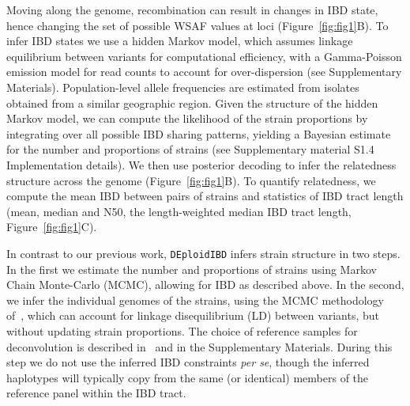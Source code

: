 \documentclass[9pt,lineno]{elife}
\begin{document}
Moving along the genome, recombination can result in changes in IBD state, hence changing the set of possible WSAF values at loci (Figure~\ref{fig:fig1}B).  To infer IBD states we use a hidden Markov model, which assumes linkage equilibrium between variants for computational efficiency, with a Gamma-Poisson emission model for read counts to account for over-dispersion (see Supplementary Materials).  Population-level allele frequencies are estimated from isolates obtained from a similar geographic region.  Given the structure of the hidden Markov model, we can compute the likelihood of the strain proportions by integrating over all possible IBD sharing patterns, yielding a Bayesian estimate for the number and proportions of strains (see Supplementary material S1.4 Implementation details).  We then use posterior decoding to infer the relatedness structure across the genome (Figure~\ref{fig:fig1}B). To quantify relatedness, we compute the mean IBD between pairs of strains and statistics of IBD tract length (mean, median and N50, the length-weighted median IBD tract length, Figure~\ref{fig:fig1}C).

In contrast to our previous work, \texttt{DEploidIBD} infers strain structure in two steps.  In the first we estimate the number and proportions of strains using Markov Chain Monte-Carlo (MCMC), allowing for IBD as described above.  In the second, we infer the individual genomes of the strains, using the MCMC methodology of~\citet{Zhu2017}, which can account for linkage disequilibrium (LD) between variants, but without updating strain proportions.  The choice of reference samples for deconvolution is described in~\citet{Zhu2017} and in the Supplementary Materials.  During this step we do not use the inferred IBD constraints {\em per se}, though the inferred haplotypes will typically copy from the same (or identical) members of the reference panel within the IBD tract.
\end{document}
